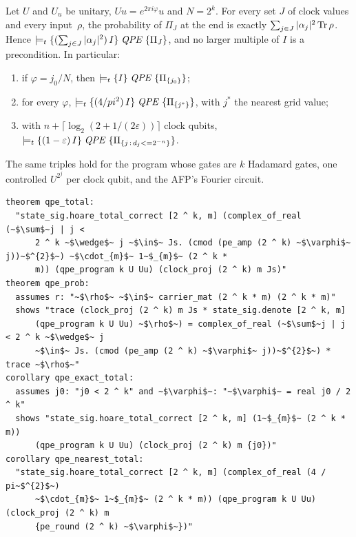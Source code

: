 \begin{theorem}\label{thm:qpe-prog}
Let $U$ and $U_u$ be unitary, $Uu=e^{2\pi i\varphi}u$ and $N=2^k$. For every set $J$ of clock values
and every input~$\rho$, the probability of $\Pi_J$ at the end is exactly $\sum_{j\in J}|\alpha_j|^2\operatorname{Tr}\rho$.
Hence $\models_{t}\{(\sum_{j\in J}|\alpha_j|^2)\,I\}\;\mathit{QPE}\;\{\Pi_J\}$, and no larger multiple of $I$ is a
precondition. In particular:
\begin{enumerate}
\item if $\varphi=j_0/N$, then $\models_{t}\{I\}\;\mathit{QPE}\;\{\Pi_{\{j_0\}}\}$;
\item for every $\varphi$, $\models_{t}\{(4/pi^2)\,I\}\;\mathit{QPE}\;\{\Pi_{\{j^*\}}\}$, with $j^*$ the nearest grid value;
\item with $n+\lceil\log_2(2+1/(2\varepsilon))\rceil$ clock qubits,
$\models_{t}\{(1-\varepsilon)\,I\}\;\mathit{QPE}\;\{\Pi_{\{j\,:\,d_j<=2^{-n}\}}\}$.
\end{enumerate}
The same triples hold for the program whose gates are $k$ Hadamard gates, one controlled $U^{2^j}$ per
clock qubit, and the AFP's Fourier circuit.
\end{theorem}

\begin{lstlisting}[float=tp,caption={Phase estimation as a program: the weakest precondition of every clock outcome, its exactness, and two of its instances (in a context with the hypotheses of Theorem~\ref{thm:qpe-prog})},label={lst:qpeprog}]
theorem qpe_total:
  "state_sig.hoare_total_correct [2 ^ k, m] (complex_of_real (~$\sum$~j | j <
      2 ^ k ~$\wedge$~ j ~$\in$~ Js. (cmod (pe_amp (2 ^ k) ~$\varphi$~ j))~$^{2}$~) ~$\cdot_{m}$~ 1~$_{m}$~ (2 ^ k *
      m)) (qpe_program k U Uu) (clock_proj (2 ^ k) m Js)"
theorem qpe_prob:
  assumes r: "~$\rho$~ ~$\in$~ carrier_mat (2 ^ k * m) (2 ^ k * m)"
  shows "trace (clock_proj (2 ^ k) m Js * state_sig.denote [2 ^ k, m]
      (qpe_program k U Uu) ~$\rho$~) = complex_of_real (~$\sum$~j | j < 2 ^ k ~$\wedge$~ j
      ~$\in$~ Js. (cmod (pe_amp (2 ^ k) ~$\varphi$~ j))~$^{2}$~) * trace ~$\rho$~"
corollary qpe_exact_total:
  assumes j0: "j0 < 2 ^ k" and ~$\varphi$~: "~$\varphi$~ = real j0 / 2 ^ k"
  shows "state_sig.hoare_total_correct [2 ^ k, m] (1~$_{m}$~ (2 ^ k * m))
      (qpe_program k U Uu) (clock_proj (2 ^ k) m {j0})"
corollary qpe_nearest_total:
  "state_sig.hoare_total_correct [2 ^ k, m] (complex_of_real (4 / pi~$^{2}$~)
      ~$\cdot_{m}$~ 1~$_{m}$~ (2 ^ k * m)) (qpe_program k U Uu) (clock_proj (2 ^ k) m
      {pe_round (2 ^ k) ~$\varphi$~})"
\end{lstlisting}

